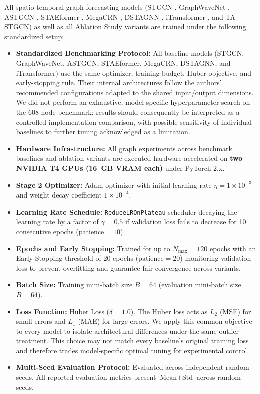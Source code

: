 \documentclass[a4paper,fleqn]{cas-sc}
\begin{document}
All spatio-temporal graph forecasting models (STGCN \cite{stgcn}, GraphWaveNet \cite{wavenet}, ASTGCN \cite{astgcn}, STAEformer \cite{staeformer}, MegaCRN \cite{megacrn}, DSTAGNN \cite{dstagnn}, iTransformer \cite{itransformer}, and TA-STGCN) as well as all Ablation Study variants are trained under the following standardized setup:
\begin{itemize}
    \item \textbf{Standardized Benchmarking Protocol:} All baseline models (STGCN, GraphWaveNet, ASTGCN, STAEformer, MegaCRN, DSTAGNN, and iTransformer) use the same optimizer, training budget, Huber objective, and early-stopping rule. Their internal architectures follow the authors' recommended configurations adapted to the shared input/output dimensions. We did not perform an exhaustive, model-specific hyperparameter search on the 608-node benchmark; results should consequently be interpreted as a controlled implementation comparison, with possible sensitivity of individual baselines to further tuning acknowledged as a limitation.
    \item \textbf{Hardware Infrastructure:} All graph experiments across benchmark baselines and ablation variants are executed hardware-accelerated on \textbf{two NVIDIA T4 GPUs (16~GB VRAM each)} under PyTorch 2.x.
    \item \textbf{Stage 2 Optimizer:} Adam optimizer \cite{adam} with initial learning rate $\eta = 1 \times 10^{-3}$ and weight decay coefficient $1 \times 10^{-4}$.
    \item \textbf{Learning Rate Schedule:} \texttt{ReduceLROnPlateau} scheduler decaying the learning rate by a factor of $\gamma = 0.5$ if validation loss fails to decrease for 10 consecutive epochs ($\text{patience} = 10$).
    \item \textbf{Epochs and Early Stopping:} Trained for up to $N_{\text{max}} = 120$ epochs with an Early Stopping threshold of 20 epochs ($\text{patience} = 20$) monitoring validation loss to prevent overfitting and guarantee fair convergence across variants.
    \item \textbf{Batch Size:} Training mini-batch size $B = 64$ (evaluation mini-batch size $B = 64$).
    \item \textbf{Loss Function:} Huber Loss \cite{huber} ($\delta = 1.0$). The Huber loss acts as $L_2$ (MSE) for small errors and $L_1$ (MAE) for large errors. We apply this common objective to every model to isolate architectural differences under the same outlier treatment. This choice may not match every baseline's original training loss and therefore trades model-specific optimal tuning for experimental control.
    \item \textbf{Multi-Seed Evaluation Protocol:} Evaluated across independent random seeds. All reported evaluation metrics present $\text{Mean} \pm \text{Std}$ across random seeds.
\end{itemize}
\end{document}
